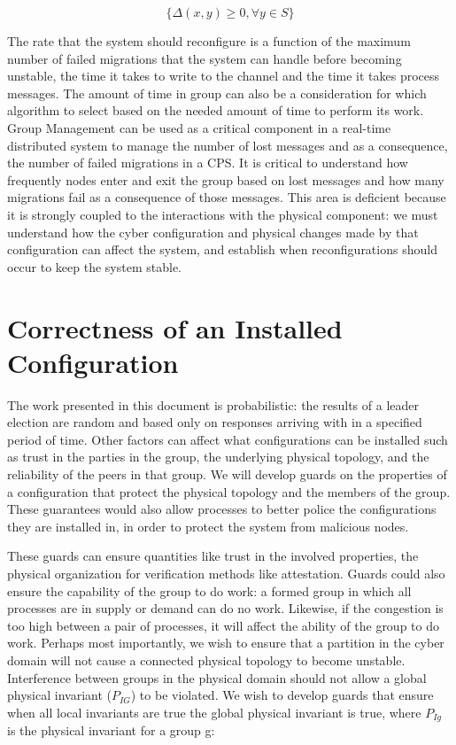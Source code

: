 \begin{equation}
\{ \Delta(x,y) \geq 0, \forall y \in S \}
\end{equation}

The rate that the system should reconfigure is a function of the maximum number of failed migrations that the system can handle before becoming unstable, the time it takes to write to the channel and the time it takes process messages.
The amount of time in group can also be a consideration for which algorithm to select based on the needed amount of time to perform its work.
Group Management can be used as a critical component in a real-time distributed system to manage the number of lost messages and as a consequence, the number of failed migrations in a CPS.
It is critical to understand how frequently nodes enter and exit the group based on lost messages and how many migrations fail as a consequence of those messages.
This area is deficient because it is strongly coupled to the interactions with the physical component: we must understand how the cyber configuration and physical changes made by that configuration can affect the system, and establish when reconfigurations should occur to keep the system stable.

\section{Correctness of an Installed Configuration}

The work presented in this document is probabilistic: the results of a leader election are random and based only on responses arriving with in a specified period of time.
Other factors can affect what configurations can be installed such as trust in the parties in the group, the underlying physical topology, and the reliability of the peers in that group.
We will develop guards on the properties of a configuration that protect the physical topology and the members of the group.
These guarantees would also allow processes to better police the configurations they are installed in, in order to protect the system from malicious nodes.

These guards can ensure quantities like trust in the involved properties, the physical organization for verification methods like attestation.
Guards could also ensure the capability of the group to do work: a formed group in which all processes are in supply or demand can do no work.
Likewise, if the congestion is too high between a pair of processes, it will affect the ability of the group to do work.
Perhaps most importantly, we wish to ensure that a partition in the cyber domain will not cause a connected physical topology to become unstable.
Interference between groups in the physical domain should not allow a global physical invariant ($P_{IG}$) to be violated.
We wish to develop guards that ensure when all local invariants are true the global physical invariant is true, where $P_{Ig}$ is the physical invariant for a group g:

